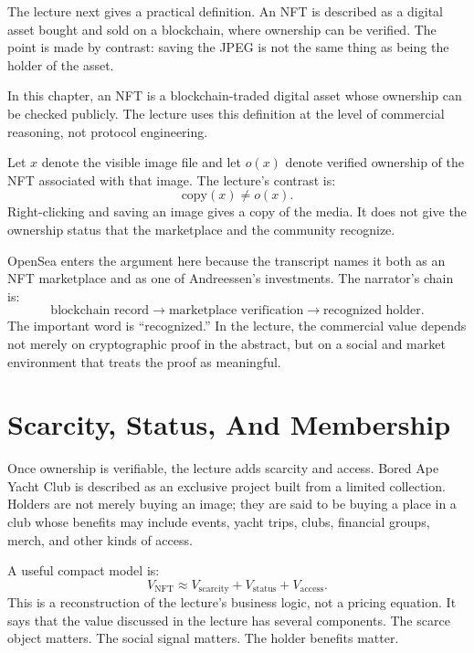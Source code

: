 The lecture next gives a practical definition. An NFT is described as a digital asset bought and sold on a blockchain, where ownership can be verified. The point is made by contrast: saving the JPEG is not the same thing as being the holder of the asset.

\begin{definition}
In this chapter, an NFT is a blockchain-traded digital asset whose ownership can be checked publicly. The lecture uses this definition at the level of commercial reasoning, not protocol engineering.
\end{definition}

Let \(x\) denote the visible image file and let \(o(x)\) denote verified ownership of the NFT associated with that image. The lecture's contrast is:
\begin{equation}
\text{copy}(x) \neq o(x).
\end{equation}
Right-clicking and saving an image gives a copy of the media. It does not give the ownership status that the marketplace and the community recognize.

OpenSea enters the argument here because the transcript names it both as an NFT marketplace and as one of Andreessen's investments. The narrator's chain is:
\begin{equation}
\text{blockchain record} \longrightarrow \text{marketplace verification} \longrightarrow \text{recognized holder}.
\end{equation}
The important word is ``recognized.'' In the lecture, the commercial value depends not merely on cryptographic proof in the abstract, but on a social and market environment that treats the proof as meaningful.

\section{Scarcity, Status, And Membership}

Once ownership is verifiable, the lecture adds scarcity and access. Bored Ape Yacht Club is described as an exclusive project built from a limited collection. Holders are not merely buying an image; they are said to be buying a place in a club whose benefits may include events, yacht trips, clubs, financial groups, merch, and other kinds of access.

A useful compact model is:
\begin{equation}
V_{\mathrm{NFT}}
\approx
V_{\mathrm{scarcity}}
+
V_{\mathrm{status}}
+
V_{\mathrm{access}}.
\end{equation}
This is a reconstruction of the lecture's business logic, not a pricing equation. It says that the value discussed in the lecture has several components. The scarce object matters. The social signal matters. The holder benefits matter.

